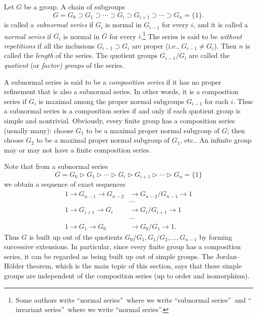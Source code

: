 \documentclass[a4paper,11pt,final]{memoir}%
\theoremstyle{nonumberplain}
\begin{document}
Let $G$ be a group. A chain of subgroups
\[
G=G_{0}\supset G_{1}\supset\cdots\supset G_{i}\supset G_{i+1}\supset
\cdots\supset G_{n}=\{1\}.
\]
is called a \emph{subnormal series}%
if $G_{i}$ is normal in $G_{i-1}$ for every $i$, and it is called a
\emph{normal series}%
if $G_{i}$ is normal in $G$ for every $i$.\footnote{Some authors write
\textquotedblleft normal series\textquotedblright\ where we write
\textquotedblleft subnormal series\textquotedblright\ and \textquotedblleft
invariant series\textquotedblright\ where we write \textquotedblleft normal
series\textquotedblright.} The series is said to be \emph{without repetitions}%
if all the inclusions $G_{i-1}\supset G_{i}$ are proper (i.e., $G_{i-1}\neq
G_{i}$). Then $n$ is called the \emph{length\/}%
of the series. The quotient groups $G_{i-1}/G_{i}$ are called the
\emph{quotient\/} (or \emph{factor)\/} \emph{groups}%
of the series.

A subnormal series is said to be a \emph{composition series\/}%
if it has no proper refinement that is also a subnormal series. In other
words, it is a composition series if $G_{i}$ is maximal among the proper
normal subgroups $G_{i-1}$ for each $i$. Thus a subnormal series is a
composition series if and only if each quotient group is simple and
nontrivial. Obviously, every finite group has a composition series (usually
many): choose $G_{1}$ to be a maximal proper normal subgroup of $G$; then
choose $G_{2}$ to be a maximal proper normal subgroup of $G_{1}$, etc.. An
infinite group may or may not have a finite composition series.

Note that from a subnormal series
\[
G=G_{0}\triangleright G_{1}\triangleright\cdots\triangleright G_{i}%
\triangleright G_{i+1}\triangleright\cdots\triangleright G_{n}=\{1\}
\]
we obtain a sequence of exact sequences%
\begin{align*}
1\rightarrow G_{n-1}\rightarrow G_{n-2}  &  \rightarrow G_{n-2}/G_{n-1}%
\rightarrow1\\
&  \cdots\\
1\rightarrow G_{i+1}\rightarrow G_{i}  &  \rightarrow G_{i}/G_{i+1}%
\rightarrow1\\
&  \cdots\\
1\rightarrow G_{1}\rightarrow G_{0}  &  \rightarrow G_{0}/G_{1}\rightarrow1.
\end{align*}
Thus $G$ is built up out of the quotients $G_{0}/G_{1},G_{1}/G_{2}%
,\ldots,G_{n-1}$ by forming successive extensions. In particular, since every
finite group has a composition series, it can be regarded as being built up
out of simple groups. The Jordan--H\"{o}lder theorem, which is the main topic
of this section, says that these simple groups are independent of the
composition series (up to order and isomorphism).
\end{document}
